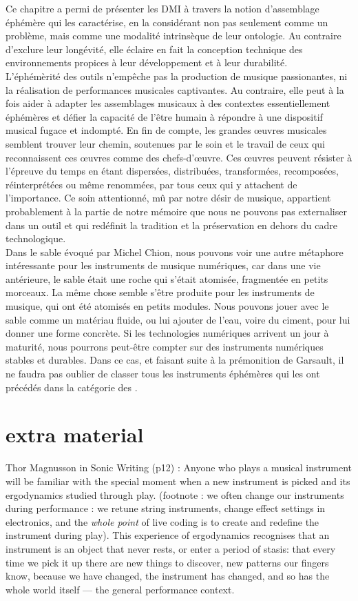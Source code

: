 \noindent Ce chapitre a permi de présenter les \gls{DMI} à travers la notion d'assemblage éphémère qui les caractérise, en la considérant non pas seulement comme un problème, mais comme une modalité intrinsèque de leur ontologie. Au contraire d'exclure leur longévité, elle éclaire en fait la conception technique des environnements propices à leur développement et à leur durabilité.\\
\indent  L'éphémèrité des outils n'empêche pas la production de musique passionantes, ni la réalisation de performances musicales captivantes. Au contraire, elle peut à la fois aider à adapter les assemblages musicaux à des contextes essentiellement éphémères et défier la capacité de l'être humain à répondre à une dispositif musical fugace et indompté. En fin de compte, les grandes œuvres musicales semblent trouver leur chemin, soutenues par le soin et le travail de ceux qui reconnaissent ces œuvres comme des chefs-d'œuvre. Ces œuvres peuvent résister à l'épreuve du temps en étant dispersées, distribuées, transformées, recomposées, réinterprétées ou même renommées, par tous ceux qui y attachent de l'importance. Ce soin attentionné, mû par notre désir de musique, appartient probablement à la partie de notre mémoire que nous ne pouvons pas externaliser dans un outil et qui redéfinit la tradition et la préservation en dehors du cadre technologique.\\
\indent Dans le sable évoqué par Michel Chion, nous pouvons voir une autre métaphore intéressante pour les instruments de musique numériques, car dans une vie antérieure, le sable était une roche qui s'était atomisée, fragmentée en petits morceaux. La même chose semble s'être produite pour les instruments de musique, qui ont été atomisés en petits modules. Nous pouvons jouer avec le sable comme un matériau fluide, ou lui ajouter de l'eau, voire du ciment, pour lui donner une forme concrète.
\indent Si les technologies numériques arrivent un jour à maturité, nous pourrons peut-être compter sur des instruments numériques stables et durables. Dans ce cas, et faisant suite à la prémonition de Garsault, il ne faudra pas oublier de classer tous les instruments éphémères qui les ont précédés dans la catégorie des .


\section{extra material}

Thor Magnusson in Sonic Writing (p12) : Anyone who plays a musical instrument will be familiar with the special moment when a new instrument is picked and its ergodynamics studied through play. (footnote : we often change our instruments during performance : we retune string instruments, change effect settings in electronics, and the \textit{whole point} of live coding is to create and redefine the instrument during play). This experience of ergodynamics recognises that an instrument is an object that never rests, or enter a period of stasis: that every time we pick it up there are new things to discover, new patterns our fingers know, because we have changed, the instrument has changed, and so has the whole world itself — the general performance context.

